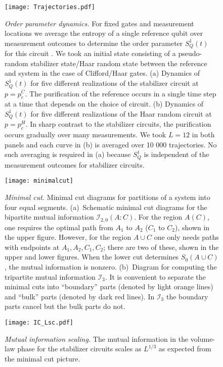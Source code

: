 \documentclass[prl,twocolumn,aps,showpacs,amsmath,amssymb,superscriptaddress,floatfix,longbibliography]{revtex4-1}
\begin{document}
\begin{figure}[htbp]
\begin{center}
\texttt{[image: Trajectories.pdf]}
\caption{\emph{Order parameter dynamics.} For fixed gates and measurement locations we average the entropy of a single reference qubit over measurement outcomes to determine the order parameter $S_Q^1(t)$ for this circuit \cite{Gullans2019b}. We took an initial state consisting of a pseudo-random stabilizer state/Haar random state between the reference and system in the case of Clifford/Haar gates. (a) Dynamics of $S_Q^1(t)$ for five different realizations of the stabilizer circuit at $p=p_c^{C}$.  The purification of the reference occurs in a single time step at a time that depends on the choice of circuit. (b) Dynamics of $S_Q^1(t)$ for five different realizations of the Haar random circuit at $p=p_c^H$.  In sharp contrast to the stabilizer circuits, the purification occurs gradually over many measurements.  We took $L=12$ in both panels and each curve in (b) is averaged over 10 000 trajectories.  No such averaging is required in (a) because $S_Q^1$ is independent of the measurement outcomes for stabilizer circuits. }
\label{fig:trajectories}
\end{center}
\end{figure}

\begin{figure}[htbp]
\begin{center}
\texttt{[image: minimalcut]}
\caption{\emph{Minimal cut.} Minimal cut diagrams for partitions of a system into four equal segments. (a)~Schematic minimal cut diagrams for the bipartite mutual information $\mathcal{I}_{2,0}(A:C)$. For the region $A (C)$, one requires the optimal path from $A_1$ to $A_2$ ($C_1$ to $C_2$), shown in the upper figure. However, for the region $A \cup C$ one only needs paths with endpoints at $A_1, A_2, C_1, C_2$; there are two of these, shown in the upper and lower figures. When the lower cut determines $S_0(A \cup C)$, the mutual information is nonzero. (b)~Diagram for computing the tripartite mutual information $\mathcal{I}_3$. It is convenient to separate the minimal cuts into ``boundary'' parts (denoted by light orange lines) and ``bulk'' parts (denoted by dark red lines). In $\mathcal{I}_3$ the boundary parts cancel but the bulk parts do not.}
\label{minimalcut}
\end{center}
\end{figure}

\begin{figure}[htbp]
\centering
\texttt{[image: IC\_Lsc.pdf]}
\caption{\emph{Mutual information scaling.} The mutual information in the volume-law phase for the stabilizer circuits scales as $L^{1/3}$ as expected from the minimal cut picture.}
	\label{fig:MISc}
\end{figure}
\end{document}
